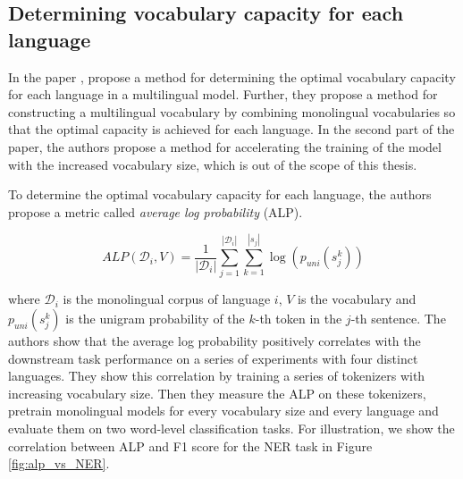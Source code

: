 
\subsection{Determining vocabulary capacity for each language}
\label{sec:zheng}

In the paper , \citeauthor{zheng_allocating_2021} propose a method for determining the optimal vocabulary capacity for each language in a multilingual model. Further, they propose a method for constructing a multilingual vocabulary by combining monolingual vocabularies so that the optimal capacity is achieved for each language. In the second part of the paper, the authors propose a method for accelerating the training of the model with the increased vocabulary size, which is out of the scope of this thesis.



To determine the optimal vocabulary capacity for each language, the authors propose a metric called \textit{average log probability} (ALP). 

$$
ALP(\mathcal{D}_i, V) = \frac{1}{|\mathcal{D}_i|} \sum_{j=1}^{|\mathcal{D}_i|} \sum_{k=1}^{|s_j|} \log(p_{uni}(s^k_{j}))
$$

where $\mathcal{D}_i$ is the monolingual corpus of language $i$, $V$ is the vocabulary and $p_{uni}(s^k_{j})$ is the unigram probability of the $k$-th token in the $j$-th sentence. The authors show that the average log probability positively correlates with the downstream task performance on a series of experiments with four distinct languages. They show this correlation by training a series of tokenizers with increasing vocabulary size. Then they measure the ALP on these tokenizers, pretrain monolingual models for every vocabulary size and every language and evaluate them on two word-level classification tasks. For illustration, we show the correlation between ALP and F1 score for the NER task in Figure \ref{fig:alp_vs_NER}. 

